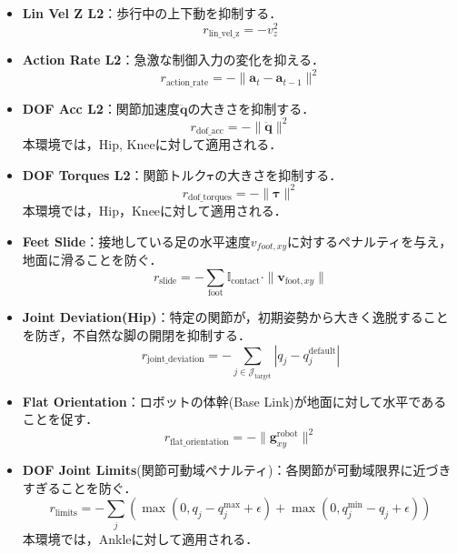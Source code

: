 \begin{itemize}
  \item \textbf{Lin Vel Z L2}：歩行中の上下動を抑制する．
    \begin{equation}
      r_{\text{lin\_vel\_z}} = - v_z^2
    \end{equation}
  \item \textbf{Action Rate L2}：急激な制御入力の変化を抑える．
    \begin{equation}
      r_{\text{action\_rate}} = - \| \mathbf{a}_t - \mathbf{a}_{t-1} \|^2
    \end{equation}
  \item \textbf{DOF Acc L2}：関節加速度$\ddot{\mathbf{q}}$の大きさを抑制する．
    \begin{equation}
      r_{\text{dof\_acc}} = - \| \ddot{\mathbf{q}} \|^2
    \end{equation}
    本環境では，Hip, Kneeに対して適用される．
  \item \textbf{DOF Torques L2}：関節トルク$\boldsymbol{\tau}$の大きさを抑制する．
    \begin{equation}
      r_{\text{dof\_torques}} = - \| \boldsymbol{\tau} \|^2
    \end{equation}
    本環境では，Hip，Kneeに対して適用される．
  \item \textbf{Feet Slide}：接地している足の水平速度$v_{foot,xy}$に対するペナルティを与え，地面に滑ることを防ぐ．
    \begin{equation}
      r_{\text{slide}} = - \sum_{\text{foot}} \mathbb{I}_{\text{contact}} \cdot \| \mathbf{v}_{\text{foot}, xy} \|
    \end{equation}
  \item \textbf{Joint Deviation(Hip)}：特定の関節が，初期姿勢から大きく逸脱することを防ぎ，不自然な脚の開閉を抑制する．
    \begin{equation}
      r_{\text{joint\_deviation}} = - \sum_{j \in \mathcal{J}_{\text{target}}} | q_j - q_{j}^{\text{default}} |
    \end{equation}
  \item \textbf{Flat Orientation}：ロボットの体幹(Base Link)が地面に対して水平であることを促す．
    \begin{equation}
      r_{\text{flat\_orientation}} = - \| \mathbf{g}^{\text{robot}}_{xy} \|^2
    \end{equation}
  \item \textbf{DOF Joint Limits}(関節可動域ペナルティ)：各関節が可動域限界に近づきすぎることを防ぐ．
  \begin{equation}
    r_{\text{limits}} = - \sum_{j} \left( \max(0, q_j - q_{j}^{\text{max}} + \epsilon) + \max(0, q_{j}^{\text{min}} - q_j + \epsilon) \right)
  \end{equation}
  本環境では，Ankleに対して適用される．
\end{itemize}

